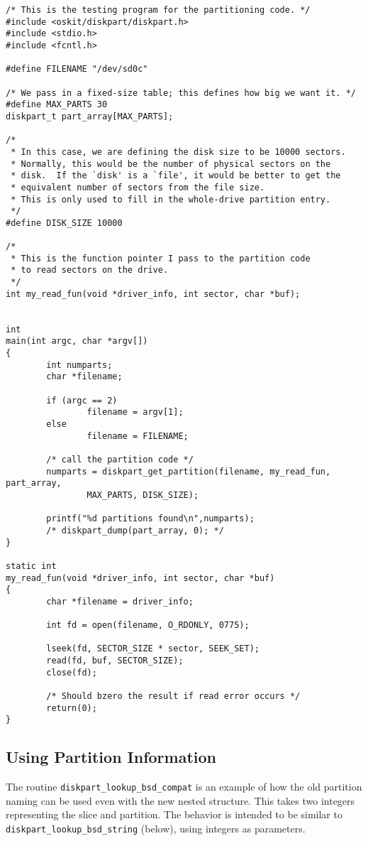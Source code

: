 \begin{verbatim}
/* This is the testing program for the partitioning code. */
#include <oskit/diskpart/diskpart.h>
#include <stdio.h>
#include <fcntl.h>

#define FILENAME "/dev/sd0c"

/* We pass in a fixed-size table; this defines how big we want it. */
#define MAX_PARTS 30
diskpart_t part_array[MAX_PARTS];

/*
 * In this case, we are defining the disk size to be 10000 sectors.
 * Normally, this would be the number of physical sectors on the
 * disk.  If the `disk' is a `file', it would be better to get the
 * equivalent number of sectors from the file size.
 * This is only used to fill in the whole-drive partition entry.
 */
#define DISK_SIZE 10000

/*
 * This is the function pointer I pass to the partition code
 * to read sectors on the drive.
 */
int my_read_fun(void *driver_info, int sector, char *buf);


int
main(int argc, char *argv[])
{
        int numparts;
        char *filename;

        if (argc == 2)
                filename = argv[1];
        else
                filename = FILENAME;

        /* call the partition code */
        numparts = diskpart_get_partition(filename, my_read_fun, part_array, 
                MAX_PARTS, DISK_SIZE);

        printf("%d partitions found\n",numparts);
        /* diskpart_dump(part_array, 0); */
}
 
static int
my_read_fun(void *driver_info, int sector, char *buf)
{
        char *filename = driver_info;

        int fd = open(filename, O_RDONLY, 0775);

        lseek(fd, SECTOR_SIZE * sector, SEEK_SET);
        read(fd, buf, SECTOR_SIZE);
        close(fd);

        /* Should bzero the result if read error occurs */
        return(0);
}
\end{verbatim}

\subsection{Using Partition Information}
The routine {\tt diskpart_lookup_bsd_compat} is an example of how the
old partition naming
can be used even with the new nested structure.  This takes two
integers representing the slice and partition.  The behavior is
intended to be similar to {\tt diskpart_lookup_bsd_string} (below),
using integers as parameters.


